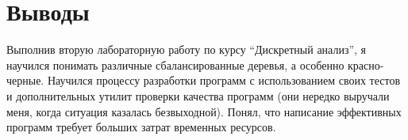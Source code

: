 \section{Выводы}


Выполнив вторую лабораторную работу по курсу \enquote{Дискретный анализ}, я научился понимать различные сбалансированные деревья, а особенно красно-черные. Научился процессу разработки программ с использованием своих тестов и дополнительных утилит проверки качества программ (они нередко выручали меня, когда ситуация казалась безвыходной). Понял, что написание эффективных программ требует больших затрат временных ресурсов.
\pagebreak